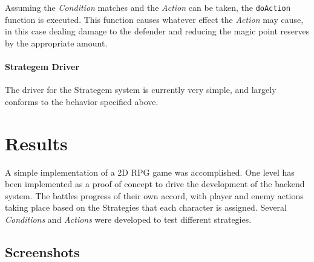 \documentclass[11pt]{article}
\begin{document}
Assuming the \emph{Condition} matches and the \emph{Action} can be taken, the \texttt{doAction} function is executed.  This function causes whatever effect the \emph{Action} may cause, in this case dealing damage to the defender and reducing the magic point reserves by the appropriate amount.  

\paragraph{Strategem Driver} \hfill

The driver for the Strategem system is currently very simple, and largely conforms to the behavior specified above.  

\singlespacing
{}
\doublespacing

\section{Results}

A simple implementation of a 2D RPG game was accomplished.  One level has been implemented as a proof of concept to drive the development of the backend system.  The battles progress of their own accord, with player and enemy actions taking place based on the Strategies that each character is assigned.  Several \emph{Conditions} and \emph{Actions} were developed to test different strategies.

\newpage
\subsection{Screenshots} 
\end{document}
